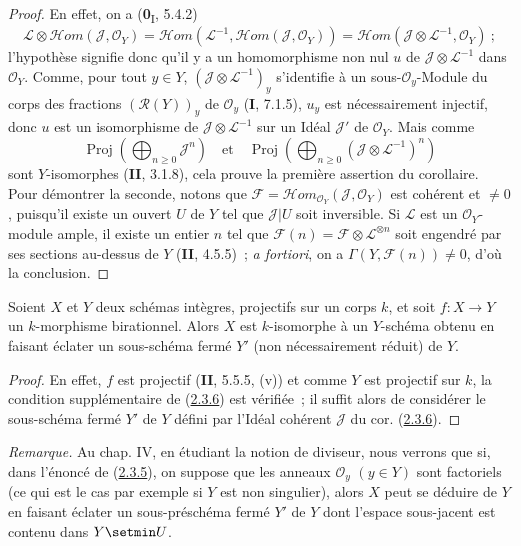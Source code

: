 \begin{proof}
En effet, on a (\textbf{0}\textsubscript{I}, 5.4.2)
\[
\mathcal L\otimes\mathcal{H}om(\mathcal J,\mathcal O_Y)
=\mathcal{H}om(\mathcal L^{-1},\mathcal{H}om(\mathcal J,\mathcal O_Y))
=\mathcal{H}om(\mathcal J\otimes\mathcal L^{-1},\mathcal O_Y)~;
\]
l'hypothèse signifie donc qu'il y a un homomorphisme non nul $u$ de
$\mathcal J\otimes\mathcal L^{-1}$ dans $\mathcal O_Y$. Comme, pour tout
$y\in Y$, $(\mathcal J\otimes\mathcal L^{-1})_y$ s'identifie à un
sous-$\mathcal O_y$-Module du corps des fractions $(\mathcal R(Y))_y$ de
$\mathcal O_y$ (\textbf{I}, 7.1.5), $u_y$ est nécessairement injectif, donc $u$
est un isomorphisme de $\mathcal J\otimes\mathcal L^{-1}$ sur un Idéal
$\mathcal J'$ de $\mathcal O_Y$. Mais comme
\[
\operatorname{Proj}\left(\bigoplus_{n\geq0}\mathcal J^n\right)
\quad\text{et}\quad
\operatorname{Proj}\left(
\bigoplus_{n\geq0}(\mathcal J\otimes\mathcal L^{-1})^n\right)
\]
sont $Y$-isomorphes (\textbf{II}, 3.1.8), cela prouve la première assertion du
corollaire. Pour démontrer la seconde, notons que
$\mathcal F=\mathcal{H}om_{\mathcal O_Y}(\mathcal J,\mathcal O_Y)$ est
cohérent et $\neq0$, puisqu'il existe un ouvert $U$ de $Y$ tel que
$\mathcal J|U$ soit inversible. Si $\mathcal L$ est un
$\mathcal O_Y$-module ample, il existe un entier $n$ tel que
$\mathcal F(n)=\mathcal F\otimes\mathcal L^{\otimes n}$ soit engendré par
ses sections au-dessus de $Y$ (\textbf{II}, 4.5.5)~; \emph{a fortiori}, on a
$\Gamma(Y,\mathcal F(n))\neq0$, d'où la conclusion.
\end{proof}

\begin{corollary}[2.3.7]
\label{III.2.3.7-fr}
Soient $X$ et $Y$ deux schémas intègres, projectifs sur un corps $k$, et
soit $f:X\to Y$ un $k$-morphisme birationnel. Alors $X$ est $k$-isomorphe
à un $Y$-schéma obtenu en faisant éclater un sous-schéma fermé $Y'$
(non nécessairement réduit) de $Y$.
\end{corollary}

\begin{proof}
En effet, $f$ est projectif (\textbf{II}, 5.5.5, (v)) et comme $Y$ est projectif
sur $k$, la condition supplémentaire de
(\hyperref[III.2.3.6-fr]{2.3.6}) est vérifiée~; il suffit alors de
considérer le sous-schéma fermé $Y'$ de $Y$ défini par l'Idéal cohérent
$\mathcal J$ du cor. (\hyperref[III.2.3.6-fr]{2.3.6}).
\end{proof}

\begin{env}[2.3.8]
\label{III.2.3.8-fr}
\emph{Remarque.} Au chap. IV, en étudiant la notion de diviseur, nous
verrons que si, dans l'énoncé de
(\hyperref[III.2.3.5-fr]{2.3.5}), on suppose que les anneaux
$\mathcal O_y$ $(y\in Y)$ sont factoriels (ce qui est le cas par exemple
si $Y$ est non singulier), alors $X$ peut se déduire de $Y$ en faisant
éclater un sous-préschéma fermé $Y'$ de $Y$ dont l'espace sous-jacent est
contenu dans $Y\setmin U$.
\end{env}

